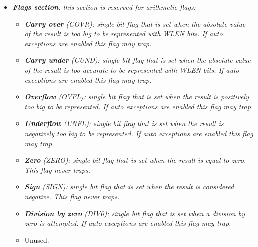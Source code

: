 \documentclass{article}
\begin{document}
                \begin{itemize}

                    \item \textit{\textbf{Flags section}: this section is reserved for arithmetic flags:}

                        \begin{itemize}

                            \item \textit{\textbf{Carry over} (COVR): single bit flag that is set when the absolute value of the result is too big to be represented with WLEN bits. If auto exceptions are enabled this flag may trap.}

                            \item \textit{\textbf{Carry under} (CUND): single bit flag that is set when the absolute value of the result is too accurate to be represented with WLEN bits. If auto exceptions are enabled this flag may trap.}

                            \item \textit{\textbf{Overflow} (OVFL): single bit flag that is set when the result is positively too big to be represented. If auto exceptions are enabled this flag may trap.}

                            \item \textit{\textbf{Underflow} (UNFL): single bit flag that is set when the result is negatively too big to be represented. If auto exceptions are enabled this flag may trap.}

                            \item \textit{\textbf{Zero} (ZERO): single bit flag that is set when the result is equal to zero. This flag never traps.}

                            \item \textit{\textbf{Sign} (SIGN): single bit flag that is set when the result is considered negative. This flag never traps.}

                            \item \textit{\textbf{Division by zero} (DIV0): single bit flag that is set when a division by zero is attempted.  If auto exceptions are enabled this flag may trap.}

                            \item Unused.

                        \end{itemize}


\end{itemize}
\end{document}
